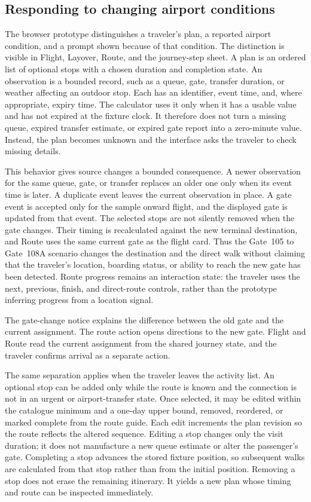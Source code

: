 \documentclass[sigconf,nonacm,balance=false]{acmart}
\begin{document}
\subsection{Responding to changing airport conditions}

The browser prototype distinguishes a traveler's
plan, a reported airport condition, and a prompt shown because of that condition.
The distinction is visible in Flight, Layover, Route, and the journey-step
sheet.  A plan is an ordered list of optional stops with a chosen duration and
completion state.  An observation is a bounded record, such as a queue, gate,
transfer duration, or weather affecting an outdoor stop.  Each has an
identifier, event time, and, where appropriate, expiry time.  The calculator
uses it only when it has a usable value and has not expired at the fixture
clock.  It therefore does not turn a missing queue, expired transfer estimate,
or expired gate report into a zero-minute value.  Instead, the plan becomes
unknown and the interface asks the traveler to check missing details.

This behavior gives source changes a bounded consequence.  A newer observation
for the same queue, gate, or transfer replaces an older one only when its event
time is later. A duplicate event leaves the current observation in place. A gate event is
accepted only for the sample onward flight, and the displayed gate is updated
from that event.  The selected stops are not silently removed when the gate
changes.  Their timing is recalculated against the new terminal destination,
and Route uses the same current gate as the flight card.  Thus the Gate~105 to
Gate~108A scenario changes the destination and the direct walk without claiming
that the traveler's location, boarding status, or ability to reach the new gate
has been detected.  Route progress remains an interaction state: the traveler
uses the next, previous, finish, and direct-route controls, rather than the
prototype inferring progress from a location signal.

The gate-change notice explains the difference between the old gate and the
current assignment. The route action opens directions to the new gate. Flight
and Route read the current assignment from the shared journey state, and the
traveler confirms arrival as a separate action.

The same separation applies when the traveler leaves the activity list.  An
optional stop can be added only while the route is known and the connection is
not in an urgent or airport-transfer state.  Once selected, it may be edited
within the catalogue minimum and a one-day upper bound, removed, reordered, or
marked complete from the route guide.  Each edit increments the plan revision so the route reflects the altered sequence.  Editing a stop changes only the visit
duration; it does not manufacture a new queue estimate or alter the passenger's
gate.  Completing a stop advances the stored fixture position, so subsequent
walks are calculated from that stop rather than from the initial position.
Removing a stop does not erase the remaining itinerary.  It yields a new plan
whose timing and route can be inspected immediately.
\end{document}
